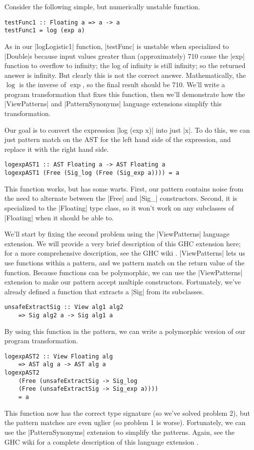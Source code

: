 \documentclass[preprint]{sigplanconf}
\theoremstyle{definition}
\begin{document}
Consider the following simple,
but numerically unstable function.
\begin{lstlisting}
testFunc1 :: Floating a => a -> a
testFunc1 = log (exp a)
\end{lstlisting}
As in our |logLogistic1| function, |testFunc| is unstable when specialized to |Double|s
because input values greater than (approximately) 710 cause the |exp| function to overflow to infinity;
the log of infinity is still infinity;
so the returned answer is infinity.
But clearly this is not the correct answer.
Mathematically, the $\log$ is the inverse of $\exp$, so the final result should be 710.
We'll write a program transformation that fixes this function,
then we'll demonstrate how the |ViewPatterns| and |PatternSynonyms| language extensions simplify this transformation.

Our goal is to convert the expression |log (exp x)| into just |x|.
To do this, we can just pattern match on the AST for the left hand side of the expression,
and replace it with the right hand side.
\begin{lstlisting}
logexpAST1 :: AST Floating a -> AST Floating a
logexpAST1 (Free (Sig_log (Free (Sig_exp a)))) = a
\end{lstlisting}
This function works, but has some warts.
First, our pattern contains noise from the need to alternate between the |Free| and |Sig_| constructors.
Second, it is specialized to the |Floating| type class,
so it won't work on any subclasses of |Floating| when it should be able to.

We'll start by fixing the second problem using the |ViewPatterns| language extension.
We will provide a very brief description of this GHC extension here;
for a more comprehensive description, see the GHC wiki \cite{viewpatterns}.
|ViewPatterns| lets us use functions within a pattern,
and we pattern match on the return value of the function.
Because functions can be polymorphic,
we can use the |ViewPatterns| extension to make our pattern accept multiple constructors.
Fortunately, we've already defined a function that extracts a |Sig| from its subclasses.
\begin{lstlisting}
unsafeExtractSig :: View alg1 alg2
    => Sig alg2 a -> Sig alg1 a
\end{lstlisting}
By using this function in the pattern, we can write a polymorphic version of our program transformation.
\begin{lstlisting}
logexpAST2 :: View Floating alg
    => AST alg a -> AST alg a
logexpAST2
    (Free (unsafeExtractSig -> Sig_log
    (Free (unsafeExtractSig -> Sig_exp a))))
    = a
\end{lstlisting}
This function now has the correct type signature (so we've solved problem 2),
but the pattern matches are even uglier (so problem 1 is worse).
Fortunately, we can use the |PatternSynonyms| extension to simplify the patterns.
Again, see the GHC wiki for a complete description of this language extension \cite{patternsynonyms}.
\end{document}
